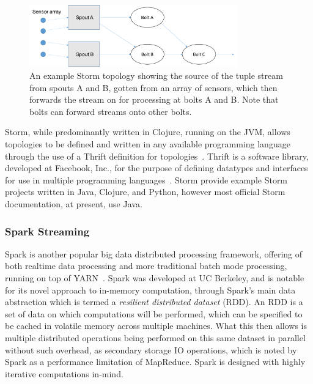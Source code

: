 \begin{figure}[h]
  \centering
  \includegraphics[width=0.8\textwidth]{includes/figures/fig_storm_topology1}
  \caption{An example Storm topology showing the source of the tuple stream from spouts A and B, gotten from an array
  of sensors, which then forwards the stream on for processing at bolts A and B. Note that bolts can forward streams
  onto other bolts.}
  \label{fig:storm_topology}
\end{figure}

Storm, while predominantly written in Clojure, running on the JVM, allows topologies to be defined and written in any
available programming language through the use of a Thrift definition for topologies~\cite{About8:online}. Thrift is
a software library, developed at Facebook, Inc., for the purpose of defining datatypes and interfaces for use in
multiple programming languages~\cite{slee2007thrift}. Storm provide example Storm projects written in Java, Clojure,
and Python, however most official Storm documentation, at present, use Java.



\subsubsection{Spark Streaming} %
\label{ssub:spark_streaming}

Spark is another popular big data distributed processing framework, offering of both realtime data processing
and more traditional batch mode processing, running on top of YARN~\cite{zaharia2010spark}. Spark was developed at UC
Berkeley, and is notable for its novel approach to in-memory computation, through Spark's main data abstraction which is
termed a \textit{resilient distributed dataset} (RDD). An RDD is a set of data on which computations will be performed,
which can be specified to be cached in volatile memory across multiple machines. What this then allows is multiple
distributed operations being performed on this same dataset in parallel without such overhead, as secondary storage
IO operations, which is noted by Spark as a performance limitation of MapReduce. Spark is designed with highly iterative
computations in-mind.

